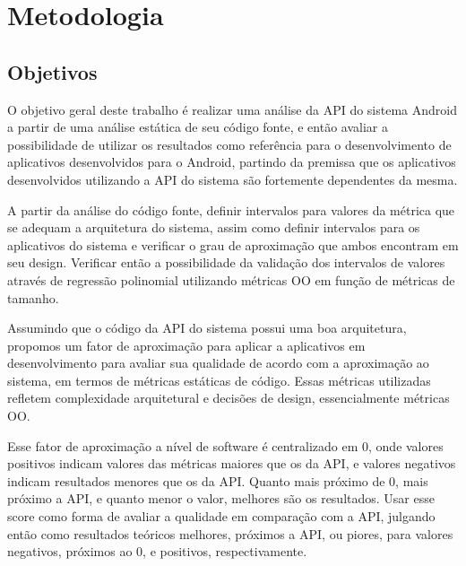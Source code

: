 \chapter{Metodologia}
\label{cap:metodologia}

\section{Objetivos}
O objetivo geral deste trabalho é realizar uma análise da API do sistema Android a partir de uma análise estática de seu código fonte, e então avaliar a possibilidade de utilizar os resultados como referência para o desenvolvimento de aplicativos desenvolvidos para o Android, partindo da premissa que os aplicativos desenvolvidos utilizando a API do sistema são fortemente dependentes da mesma.

A partir da análise do código fonte, definir intervalos para valores da métrica que se adequam a arquitetura do sistema, assim como definir intervalos para os aplicativos do sistema e verificar o grau de aproximação que ambos encontram em seu design. Verificar então a possibilidade da validação dos intervalos de valores através de regressão polinomial utilizando métricas OO em função de métricas de tamanho.

Assumindo que o código da API do sistema possui uma boa arquitetura, propomos um fator de aproximação para aplicar a aplicativos em desenvolvimento para avaliar sua qualidade de acordo com a aproximação ao sistema, em termos de métricas estáticas de código. Essas métricas utilizadas refletem complexidade arquitetural e decisões de design, essencialmente métricas OO.

Esse fator de aproximação a nível de software é centralizado em 0, onde valores positivos indicam valores das métricas maiores que os da API, e valores negativos indicam resultados menores que os da API. Quanto mais próximo de 0, mais próximo a API, e quanto menor o valor, melhores são os resultados. Usar esse score como forma de avaliar a qualidade em comparação com a API, julgando então como resultados teóricos melhores, próximos a API, ou piores, para valores negativos, próximos ao 0, e positivos, respectivamente.


